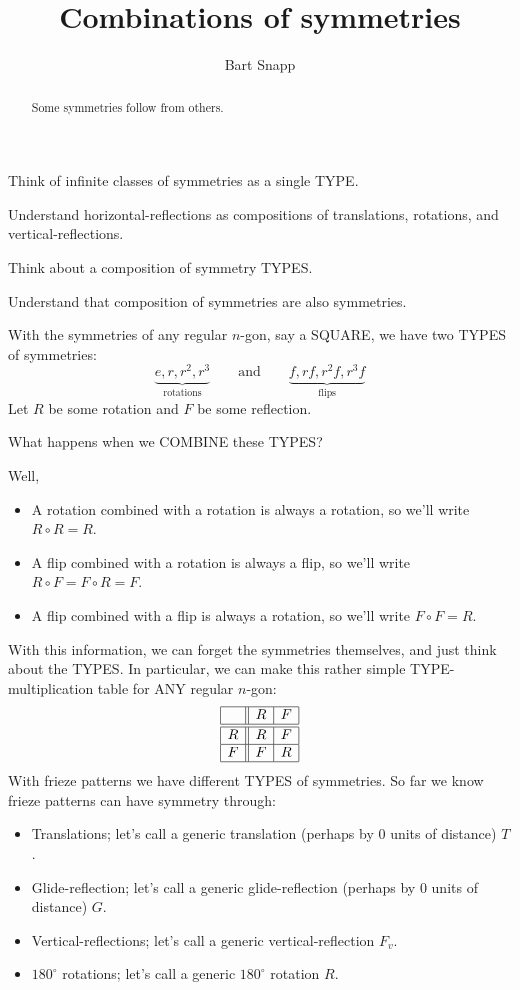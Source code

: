 \documentclass[noauthor,nooutcomes,hints        ]{ximera}
\author{Bart Snapp}
\title{Combinations of symmetries}
\begin{document}
\begin{abstract}
  Some symmetries follow from others. 
\end{abstract}
\maketitle

\begin{listOutcomes}
\item Think of infinite classes of symmetries as a single TYPE.
\item Understand horizontal-reflections as compositions of
  translations, rotations, and vertical-reflections.
\item Think about a composition of symmetry TYPES.
\item Understand that composition of symmetries are also symmetries.
\end{listOutcomes}


With the symmetries of any regular $n$-gon, say a SQUARE, we have two TYPES of symmetries:
\[
\underbrace{e,r,r^2,r^3}_{\text{rotations}} \qquad\text{and}\qquad \underbrace{f, rf,r^2f,r^3f}_{\text{flips}}
\]
Let $R$ be some rotation and $F$ be some reflection.
\begin{center}
  What happens when we COMBINE these TYPES?
\end{center}
Well,
\begin{itemize}
\item A rotation combined with a rotation is always a rotation, so we'll write $R \circ R = R$.
\item A flip combined with a rotation is always a flip, so we'll write
  $R\circ F = F \circ R = F$.
\item A flip combined with a flip is always a rotation, so we'll
  write $F\circ F = R$.
\end{itemize}
With this information, we can forget the symmetries themselves, and
just think about the TYPES. In particular, we can make this rather
simple TYPE-multiplication table for ANY regular $n$-gon:
\[
\begin{array}{|c||c|c|}
    \hline
       & R    & F    \\ \hline\hline
    R  & R    & F    \\ \hline
    F  & F    & R    \\ \hline
\end{array}
\]
With frieze patterns we have different TYPES of symmetries. So far we
know frieze patterns can have symmetry through:
\begin{itemize}
\item Translations; let's call a generic translation (perhaps by $0$ units of distance) $T$.
\item Glide-reflection; let's call a generic glide-reflection (perhaps by $0$ units of distance) $G$.
\item Vertical-reflections; let's call a generic vertical-reflection $F_v$.
\item $180^\circ$ rotations; let's call a generic $180^\circ$ rotation
  $R$.
\end{itemize}
\end{document}
